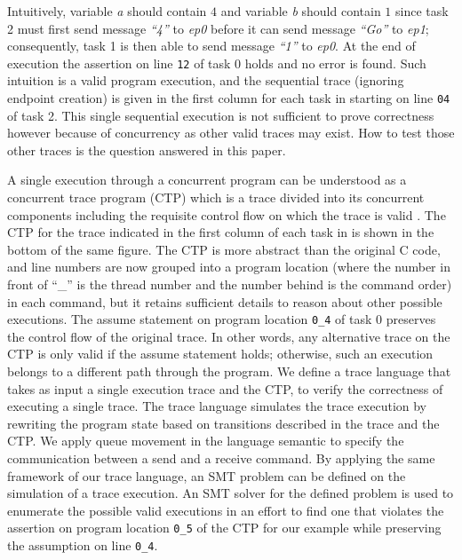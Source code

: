 Intuitively, variable \textit{a} should contain $4$ and variable
\textit{b} should contain $1$ since task 2 must first send message \textit{``4''}
to \textit{ep0} before it can send message \textit{``Go''} to \textit{ep1};
consequently, task 1 is then able to send message \textit{``1''} to
\textit{ep0}. At the end of execution the assertion on line \texttt{12}
of task 0 holds and no error is found. Such intuition is a valid
program execution, and the sequential trace (ignoring endpoint creation)
is given in the first column for each
task in  starting on line \texttt{04} of task 2. This single sequential execution is not sufficient to prove correctness
however because of concurrency as other valid traces may exist. How
to test those other traces is the question answered in this paper.

A single execution through a concurrent program can be understood as a
concurrent trace program (CTP) which is a trace divided into its
concurrent components including the requisite control flow on which
the trace is valid \cite{wang:fse09}. The CTP for the trace indicated
in the first column of each task in  is shown in
the bottom of the same figure. The CTP is more abstract than the
original C code, and line numbers are now grouped into a program location
(where the number in front of ``\_'' is the thread number and the number behind is the command order)
in each command, but it retains sufficient details to reason about
other possible executions. The assume statement on program location \texttt{0\_4}
of task 0 preserves the control flow of the original trace. In other
words, any alternative trace on the CTP is only valid if the assume
statement holds; otherwise, such an execution belongs to a different
path through the program. We define a trace language that takes as input a single execution trace and the CTP, to verify the correctness of executing a single trace. The trace language simulates the trace execution by rewriting the program state based on transitions described in the trace and the CTP. We apply queue movement in the language semantic to specify the communication between a send and a receive command. By applying the same framework of our trace language, an SMT problem can be defined on the simulation of a trace execution. An SMT solver for the defined problem is used to enumerate the
possible valid executions in an effort to find one that violates the
assertion on program location \texttt{0\_5} of the CTP for our example while preserving the assumption on line \texttt{0\_4}.

